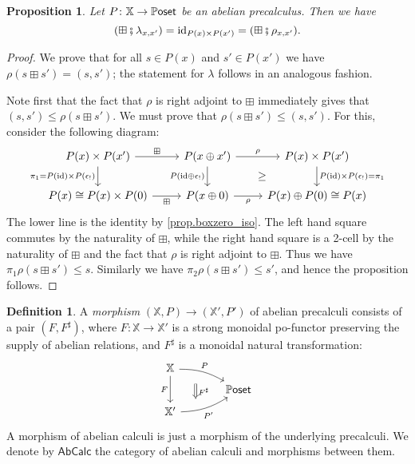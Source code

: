 \documentclass[11pt, oneside, article]{memoir}
\theoremstyle{plain}
\newtheorem{proposition}[theorem]{Proposition}
\theoremstyle{definition}
\newtheorem{definition}[theorem]{Definition}
\theoremstyle{remark}
\newcommand{\Cat}[1]{{\mathsf{#1}}}%
\newcommand{\CCat}[1]{\mathbb{\StrLeft{#1}{1}}\Cat{\StrGobbleLeft{#1}{1}}}%
\newcommand{\funn}[1]{\mathrm{#1}}%
\newcommand{\xx}{\mathbb{X}}
\newcommand{\abcalc}{\Cat{AbCalc}}
\newcommand{\id}{\funn{id}}
\newcommand{\abc}{P} %
\newcommand{\cp}{\mathbin{\fatsemi}}
\newcommand{\lsh}[1]{#1_!}
\newcommand{\pposet}{\CCat{Poset}}
\begin{document}
\begin{proposition} \label{prop.boxunbox_is_identity}
  Let $\abc\colon \xx \to \pposet$ be an abelian precalculus. Then we have 
\[(\boxplus \cp \lambda_{x,x'}) = \id_{\abc(x) \times \abc(x')} = (\boxplus \cp \rho_{x,x'}).
\]
\end{proposition}
\begin{proof}
  We prove that for all $s \in \abc(x)$ and $s' \in \abc(x')$ we have $\rho(s\boxplus s') = (s,s')$; the statement for $\lambda$ follows in an analogous fashion.

  Note first that the fact that $\rho$ is right adjoint to $\boxplus$ immediately gives that $(s,s') \le \rho(s \boxplus s')$. We must prove that $\rho(s \boxplus s')\leq (s,s')$. For this, consider the following diagram:
  \[
    \begin{tikzcd}
      \abc(x) \times \abc(x') \ar[r, "\boxplus"] \ar[d,"\pi_1=\abc(\id)\times \abc(\lsh\epsilon)"'] 
      & \abc(x\oplus x') \ar[r,"\rho"] \ar[d, "\abc(\id \oplus \lsh\epsilon)"'] 
      & \abc(x) \times \abc(x') \ar[d, "\abc(\id) \times \abc(\lsh\epsilon) = \pi_1"] \\
      \abc(x) \cong \abc(x) \times \abc(0) \ar[r, "\boxplus"'] 
      & \abc(x\oplus 0) \ar[r, "\rho"'] 
      & \abc(x) \oplus \abc(0) \cong \abc(x)\ar[ul, phantom, "\geq"]
    \end{tikzcd}
  \]
  The lower line is the identity by \cref{prop.boxzero_iso}. The left hand square commutes by the naturality of $\boxplus$, while the right hand square is a 2-cell by the naturality of $\boxplus$ and the fact that $\rho$ is right adjoint to $\boxplus$. Thus we have $\pi_1\rho(s \boxplus s') \leq s$. Similarly we have $\pi_2\rho(s\boxplus s')\leq s'$, and hence the proposition follows.
\end{proof}

\begin{definition}
A \emph{morphism} $(\xx,P)\to(\xx',P')$ of abelian precalculi consists of a pair $(F,F^\sharp)$, where $F\colon\xx\to\xx'$ is a strong monoidal po-functor preserving the supply of abelian relations, and $F^\sharp$ is a monoidal natural transformation:
\[
\begin{tikzcd}[row sep=5pt, column sep=large]
	\xx\ar[rd, bend left=15pt, pos=.4, "P", ""' name=P]\ar[dd, "F"']\\&
	\pposet\\
	\xx'\ar[ru, bend right=15pt, pos=.4, "P'"', "" name=P']
	\ar[from=P, to=P|-P', shorten <=7pt, shorten >=7pt, Rightarrow, "F^\sharp"]
\end{tikzcd}
\]
A morphism of abelian calculi is just a morphism of the underlying precalculi. We denote by $\abcalc$ the category of abelian calculi and morphisms between them.
\end{definition}
\end{document}
